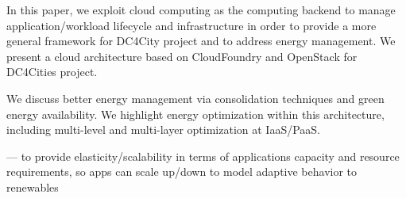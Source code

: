 

In this paper, we exploit cloud computing as the computing backend to manage application/workload lifecycle and infrastructure in order to provide a more general framework for DC4City project and to address energy management. We present a cloud architecture based on CloudFoundry and OpenStack for DC4Cities project. 

We discuss better energy management via consolidation techniques and green energy availability. We highlight energy optimization within this architecture, including multi-level and multi-layer optimization at IaaS/PaaS.


--- to provide elasticity/scalability in terms of applications capacity and resource requirements, so apps can scale up/down to model adaptive behavior to renewables
